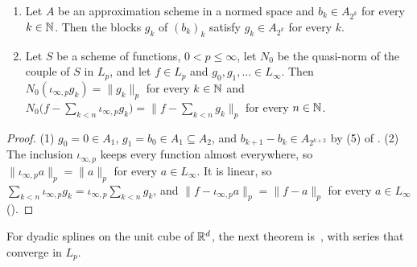 \begin{lemma}
\label{lem:besov-blocks-approximants}
\leanok
{}
\begin{enumerate}
  \item Let $A$ be an approximation scheme in a normed space and $b_k \in A_{2^k}$ for every
    $k \in \mathbb{N}$. Then the blocks $g_k$ of $(b_k)_k$ satisfy $g_k \in A_{2^k}$ for every $k$.
  \item Let $S$ be a scheme of functions, $0 < p \leq \infty$, let $N_0$ be the quasi-norm of the
    couple of $S$ in $L_p$, and let $f \in L_p$ and $g_0, g_1, \dots \in L_\infty$. Then
    $N_0(\iota_{\infty,p} g_k) = \|g_k\|_p$ for every $k \in \mathbb{N}$ and
    $N_0\bigl(f - \sum_{k<n} \iota_{\infty,p} g_k\bigr) = \bigl\|f - \sum_{k<n} g_k\bigr\|_p$
    for every $n \in \mathbb{N}$.
\end{enumerate}
\end{lemma}

\begin{proof}
\leanok
{}
(1) $g_0 = 0 \in A_1$, $g_1 = b_0 \in A_1 \subseteq A_2$, and $b_{k+1} - b_k \in A_{2^{k+2}}$ by
(5) of . (2) The inclusion $\iota_{\infty,p}$ keeps every function almost
everywhere, so $\|\iota_{\infty,p} a\|_p = \|a\|_p$ for every $a \in L_\infty$. It is linear, so
$\sum_{k<n} \iota_{\infty,p} g_k = \iota_{\infty,p} \sum_{k<n} g_k$, and
$\|f - \iota_{\infty,p} a\|_p = \|f - a\|_p$ for every $a \in L_\infty$
().
\end{proof}

For dyadic splines on the unit cube of $\mathbb{R}^d$, the next theorem
is~\cite[Theorem~5.1 and Corollary~5.3]{DeVorePopovTAMS}, with series that converge in $L_p$.

